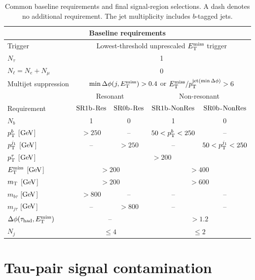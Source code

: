 \begin{table}[htbp]
    \centering
    \small
    \caption{Common baseline requirements and final signal-region selections. A dash denotes no additional requirement. The jet multiplicity includes $b$-tagged jets.}
    \label{tab:ch7_signal_regions}
    \begin{tabular}{lcccc}
        \toprule
        \multicolumn{5}{c}{Baseline requirements} \\
        \midrule
        Trigger & \multicolumn{4}{c}{Lowest-threshold unprescaled $E_{\mathrm{T}}^{\mathrm{miss}}$ trigger} \\
        $N_\tau$ & \multicolumn{4}{c}{1} \\
        $N_\ell=N_e+N_\mu$ & \multicolumn{4}{c}{0} \\
        Multijet suppression & \multicolumn{4}{c}{$\min\Delta\phi(j,E_{\mathrm{T}}^{\mathrm{miss}})>0.4$ or $E_{\mathrm{T}}^{\mathrm{miss}}/p_{\mathrm{T}}^{\mathrm{jet}(\min{\Delta\phi)}}>6$} \\
        \midrule
        & \multicolumn{2}{c}{Resonant} & \multicolumn{2}{c}{Non-resonant} \\
        Requirement & $\mathrm{SR1b}$-$\mathrm{Res}$ & $\mathrm{SR0b}$-$\mathrm{Res}$ & $\mathrm{SR1b}$-$\mathrm{NonRes}$ & $\mathrm{SR0b}$-$\mathrm{NonRes}$ \\
        \midrule
        $N_b$ & 1 & 0 & 1 & 0 \\
        $p_{\mathrm{T}}^b$ [$\mathrm{GeV}$] & $>250$ & -- & $50<p_{\mathrm{T}}^b<250$ & -- \\
        $p_{\mathrm{T}}^{j_1}$ [$\mathrm{GeV}$] & -- & $>250$ & -- & $50<p_{\mathrm{T}}^{j_1}<250$ \\
        $p_{\mathrm{T}}^\tau$ [$\mathrm{GeV}$] & \multicolumn{4}{c}{$>200$} \\
        $E_{\mathrm{T}}^{\mathrm{miss}}$ [$\mathrm{GeV}$] & \multicolumn{2}{c}{$>200$} & \multicolumn{2}{c}{$>400$} \\
        $m_{\mathrm{T}}$ [$\mathrm{GeV}$] & \multicolumn{2}{c}{$>200$} & \multicolumn{2}{c}{$>600$} \\
        $m_{b\tau}$ [$\mathrm{GeV}$] & $>800$ & -- & -- & -- \\
        $m_{j\tau}$ [$\mathrm{GeV}$] & -- & $>800$ & -- & -- \\
        $\Delta\phi(\tau_{\mathrm{had}}, E_{\mathrm{T}}^{\mathrm{miss}})$ & \multicolumn{2}{c}{--} & \multicolumn{2}{c}{$>1.2$} \\
        $N_j$ & \multicolumn{2}{c}{$\leq4$} & \multicolumn{2}{c}{$\leq2$} \\
        \bottomrule
    \end{tabular}
\end{table}

\clearpage
\section{Tau-pair signal contamination}
\label{sec:ch7_tautau_contamination}

